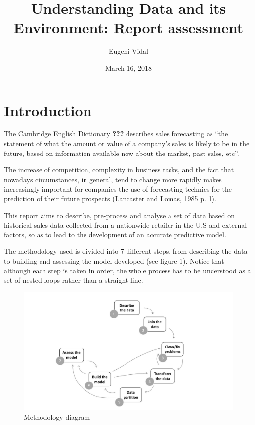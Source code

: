 \documentclass[11pt,]{article}
\title{Understanding Data and its Environment: Report assessment}
\author{Eugeni Vidal}
\date{March 16, 2018}
\begin{document}
\maketitle

{
\setcounter{tocdepth}{2}
\tableofcontents
}
\pagebreak

\section{Introduction}\label{introduction}

The Cambridge English Dictionary \textbf{???} describes sales
forecasting as ``the statement of what the amount or value of a
company's sales is likely to be in the future, based on information
available now about the market, past sales, etc''.

The increase of competition, complexity in business tasks, and the fact
that nowadays circumstances, in general, tend to change more rapidly
makes increasingly important for companies the use of forecasting
technics for the prediction of their future prospects (Lancaster and
Lomas, 1985 p. 1).

This report aims to describe, pre-process and analyse a set of data
based on historical sales data collected from a nationwide retailer in
the U.S and external factors, so as to lead to the development of an
accurate predictive model.

The methodology used is divided into 7 different steps, from describing
the data to building and assessing the model developed (see figure 1).
Notice that although each step is taken in order, the whole process has
to be understood as a set of nested loops rather than a straight line.

\begin{figure}[htbp]
\centering
\includegraphics{images/Methodology diagram.jpg}
\caption{Methodology diagram \label{}}
\end{figure}
\end{document}

